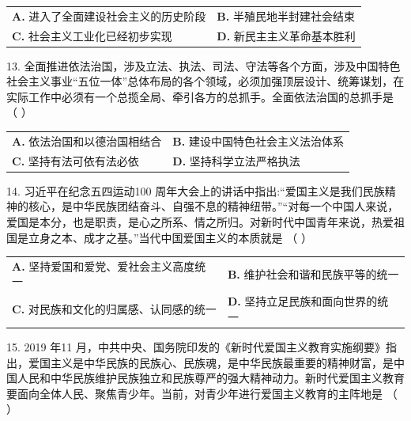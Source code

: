 \documentclass[UTF8,11pt]{ctexart}
\begin{document}
\begin{center}\begin{tabular}{>{\raggedright\arraybackslash}p{\dimexpr(\linewidth-4\tabcolsep)/2\relax}>{\raggedright\arraybackslash}p{\dimexpr(\linewidth-4\tabcolsep)/2\relax}}
\textbf{A.} 进入了全面建设社会主义的历史阶段 & \textbf{B.} 半殖民地半封建社会结束\\[.35em]
\textbf{C.} 社会主义工业化已经初步实现 & \textbf{D.} 新民主主义革命基本胜利\\[.35em]\end{tabular}\end{center}

13. 全面推进依法治国，涉及立法、执法、司法、守法等各个方面，涉及中国特色社会主义事业“五位一体”总体布局的各个领域，必须加强顶层设计、统筹谋划，在实际工作中必须有一个总揽全局、牵引各方的总抓手。全面依法治国的总抓手是 （    ）


\begin{center}\begin{tabular}{>{\raggedright\arraybackslash}p{\dimexpr(\linewidth-4\tabcolsep)/2\relax}>{\raggedright\arraybackslash}p{\dimexpr(\linewidth-4\tabcolsep)/2\relax}}
\textbf{A.} 依法治国和以德治国相结合 & \textbf{B.} 建设中国特色社会主义法治体系\\[.35em]
\textbf{C.} 坚持有法可依有法必依 & \textbf{D.} 坚持科学立法严格执法\\[.35em]\end{tabular}\end{center}

14. 习近平在纪念五四运动100 周年大会上的讲话中指出:“爱国主义是我们民族精神的核心，是中华民族团结奋斗、自强不息的精神纽带。”“对每一个中国人来说，爱国是本分，也是职责，是心之所系、情之所归。对新时代中国青年来说，热爱祖国是立身之本、成才之基。”当代中国爱国主义的本质就是 （    ）


\begin{center}\begin{tabular}{>{\raggedright\arraybackslash}p{\dimexpr(\linewidth-4\tabcolsep)/2\relax}>{\raggedright\arraybackslash}p{\dimexpr(\linewidth-4\tabcolsep)/2\relax}}
\textbf{A.} 坚持爱国和爱党、爱社会主义高度统一 & \textbf{B.} 维护社会和谐和民族平等的统一\\[.35em]
\textbf{C.} 对民族和文化的归属感、认同感的统一 & \textbf{D.} 坚持立足民族和面向世界的统一\\[.35em]\end{tabular}\end{center}

15. 2019 年11 月，中共中央、国务院印发的《新时代爱国主义教育实施纲要》指出，爱国主义是中华民族的民族心、民族魂，是中华民族最重要的精神财富，是中国人民和中华民族维护民族独立和民族尊严的强大精神动力。新时代爱国主义教育要面向全体人民、聚焦青少年。当前，对青少年进行爱国主义教育的主阵地是 （    ）
\end{document}
